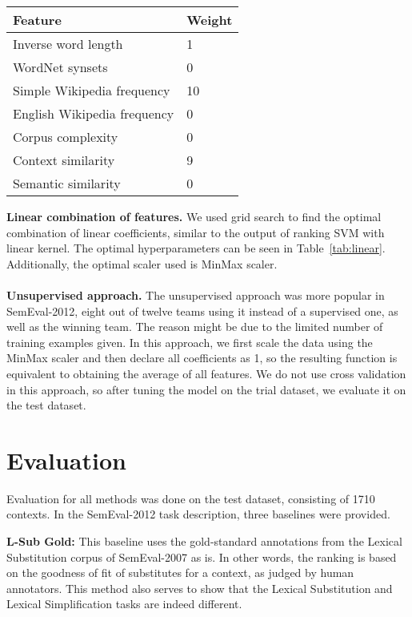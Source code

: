 \documentclass[10pt, a4paper]{article}
\begin{document}
\begin{table*}
\caption{Optimal hyperparameters for linear combination of features.}
\label{tab:linear}
\begin{center}
\begin{tabular}{ll}
\toprule
Feature & Weight \\
\midrule
Inverse word length & 1 \\
WordNet synsets & 0 \\
Simple Wikipedia frequency & 10 \\
English Wikipedia frequency & 0 \\
Corpus complexity & 0 \\
Context similarity & 9 \\
Semantic similarity & 0 \\
\bottomrule
\end{tabular}
\end{center}
\end{table*}

\textbf{Linear combination of features.} We used grid search to find the optimal combination of linear coefficients, similar to the output of ranking SVM with linear kernel. The optimal hyperparameters can be seen in Table~\ref{tab:linear}. Additionally, the optimal scaler used is MinMax scaler. \paragraph{}
\textbf{Unsupervised approach.} The unsupervised approach was more popular in SemEval-2012, eight out of twelve teams using it instead of a supervised one, as well as the winning team. The reason might be due to the limited number of training examples given. In this approach, we first scale the data using the MinMax scaler and then declare all coefficients as 1, so the resulting function is equivalent to obtaining the average of all features. We do not use cross validation in this approach, so after tuning the model on the trial dataset, we evaluate it on the test dataset.

\section{Evaluation}
Evaluation for all methods was done on the test dataset, consisting of 1710 contexts. In the SemEval-2012 task description, three baselines were provided.

\textbf{L-Sub Gold:} This baseline uses the gold-standard annotations from the Lexical Substitution corpus of SemEval-2007 as is. In other words, the ranking is based on the goodness of fit of substitutes for a context, as judged by human annotators. This method also serves to show that the Lexical Substitution and Lexical Simplification tasks are indeed different.
\end{document}
